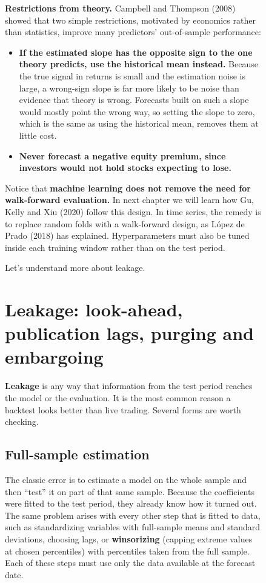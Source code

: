 \begin{figure}[htbp]
\textbf{Restrictions from theory.} Campbell and Thompson (2008) showed that two simple restrictions, motivated by economics rather than statistics, improve many predictors' out-of-sample performance:

\begin{itemize}
  \item \textbf{If the estimated slope has the opposite sign to the one theory predicts, use the historical mean instead.} Because the true signal in returns is small and the estimation noise is large, a wrong-sign slope is far more likely to be noise than evidence that theory is wrong. Forecasts built on such a slope would mostly point the wrong way, so setting the slope to zero, which is the same as using the historical mean, removes them at little cost.
  \item \textbf{Never forecast a negative equity premium, since investors would not hold stocks expecting to lose.} 
\end{itemize}

Notice that \textbf{machine learning does not remove the need for walk-forward evaluation.} In next chapter we will learn how Gu, Kelly and Xiu (2020) follow this design.
In time series, the remedy is to replace random folds with a walk-forward design, as L\'opez de Prado (2018) has explained. Hyperparameters must also be tuned inside each training window rather than on the test period. 

Let's understand more about leakage.

\section{Leakage: look-ahead, publication lags, purging and embargoing}
\label{sec:05-leakage}

\textbf{Leakage} is any way that information from the test period reaches the model or the evaluation. It is the most common reason a backtest looks better than live trading. Several forms are worth checking.

\subsection{Full-sample estimation} 

The classic error is to estimate a model on the whole sample and then ``test'' it on part of that same sample. Because the coefficients were fitted to the test period, they already know how it turned out. The same problem arises with every other step that is fitted to data, such as standardizing variables with full-sample means and standard deviations, choosing lags, or \textbf{winsorizing} (capping extreme values at chosen percentiles) with percentiles taken from the full sample. Each of these steps must use only the data available at the forecast date.


\end{figure}
